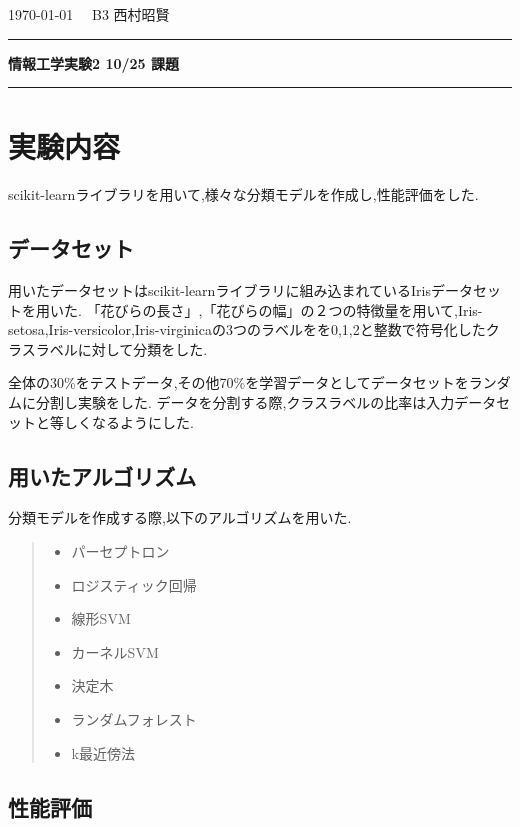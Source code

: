 \documentclass{jarticle}     %
\begin{document}
  \noindent
  \onecolumn
  \hspace{1em}

  \today
  \hfill
  \ \  B3 西村昭賢 

  \vspace{2mm}
  \hrule
  \begin{center}
  {\Large \bf 情報工学実験2 10/25 課題}
  \end{center}
  \hrule
  \vspace{3mm}


\section{実験内容}
scikit-learnライブラリを用いて,様々な分類モデルを作成し,性能評価をした.

\subsection{データセット}
用いたデータセットはscikit-learnライブラリに組み込まれているIrisデータセットを用いた.
「花びらの長さ」,「花びらの幅」の２つの特徴量を用いて,Iris-setosa,Iris-versicolor,Iris-virginicaの3つのラベルをを0,1,2と整数で符号化したクラスラベルに対して分類をした.
\par
全体の30\%をテストデータ,その他70\%を学習データとしてデータセットをランダムに分割し実験をした.
データを分割する際,クラスラベルの比率は入力データセットと等しくなるようにした.

\subsection{用いたアルゴリズム}
分類モデルを作成する際,以下のアルゴリズムを用いた.

\begin{quote}
  \begin{itemize}
   \item パーセプトロン
   \item ロジスティック回帰
   \item 線形SVM
   \item カーネルSVM
   \item 決定木
   \item ランダムフォレスト
   \item k最近傍法
  \end{itemize}
 \end{quote}



\subsection{性能評価}
\end{document}
